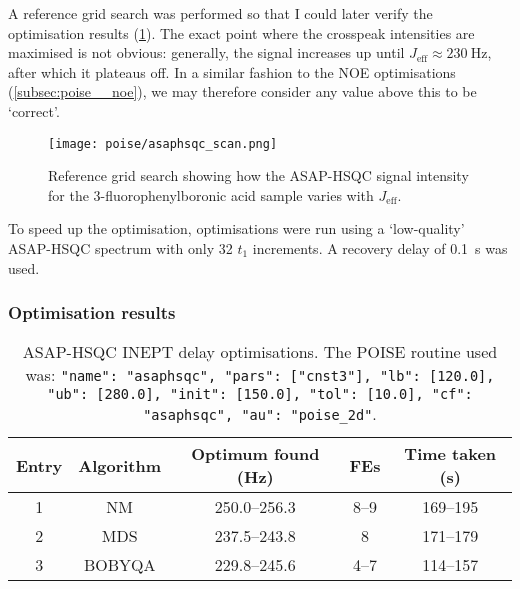 A reference grid search was performed so that I could later verify the optimisation results (\cref{fig:asaphsqc_scan}).
The exact point where the crosspeak intensities are maximised is not obvious: generally, the signal increases up until $J_\text{eff} \approx \qty{230}{\Hz}$, after which it plateaus off.
In a similar fashion to the NOE optimisations (\cref{subsec:poise__noe}), we may therefore consider any value above this to be `correct'.

\begin{figure}[htb]
    \centering
    \texttt{[image: poise/asaphsqc\_scan.png]}%
    \caption[Reference grid search for ASAP-HSQC excitation delay]{
        Reference grid search showing how the ASAP-HSQC signal intensity for the 3-fluorophenylboronic acid sample varies with $J_\text{eff}$.
    }
    \label{fig:asaphsqc_scan}
\end{figure}

To speed up the optimisation, optimisations were run using a `low-quality' ASAP-HSQC spectrum with only 32 $t_1$ increments.
A recovery delay of \qty{0.1}{\s} was used.

\subsubsection{Optimisation results}

\begin{table}[htb]
    \centering
    \begin{tabular}{ccccc}
        \toprule
        Entry & Algorithm & Optimum found (\unit{\Hz}) & FEs  & Time taken (\unit{\s}) \\
        \midrule
        1     & NM        & 250.0--256.3            & 8--9 & 169--195             \\
        2     & MDS       & 237.5--243.8            & 8    & 171--179             \\
        3     & BOBYQA    & 229.8--245.6            & 4--7 & 114--157             \\
        \bottomrule
    \end{tabular}
    \caption[ASAP-HSQC INEPT delay optimisations]{
        ASAP-HSQC INEPT delay optimisations.
        The POISE routine used was: \texttt{{"name": "asaphsqc", "pars": ["cnst3"], "lb": [120.0], "ub": [280.0], "init": [150.0], "tol": [10.0], "cf": "asaphsqc", "au": "poise_2d"}}.
    }
    \label{tbl:poise_asaphsqc}
\end{table}

